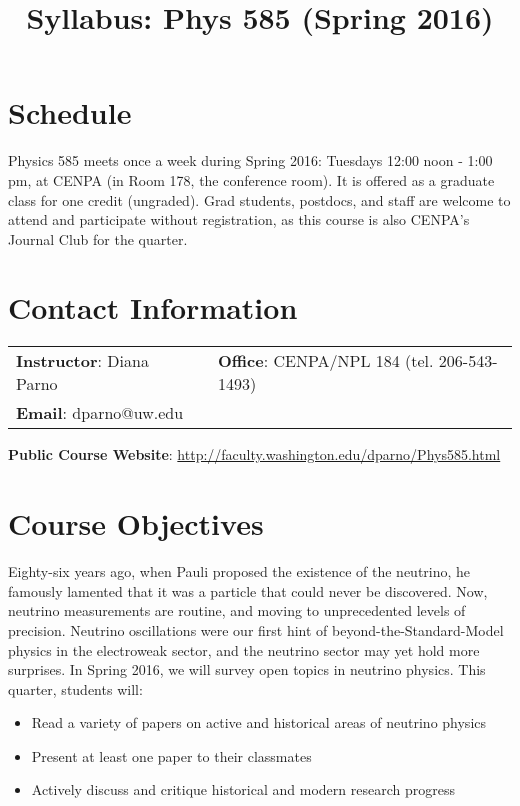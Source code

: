 \documentclass[12pt]{amsart}
\title{Syllabus: Phys 585 (Spring 2016)}
\date{} %
\begin{document}
\maketitle

\section{Schedule}

Physics 585 meets once a week during Spring 2016: Tuesdays 12:00 noon - 1:00 pm, at CENPA (in Room 178, the conference room). It is offered as a graduate class for one credit (ungraded). Grad students, postdocs, and staff are welcome to attend and participate without registration, as this course is also CENPA's Journal Club for the quarter.

\section{Contact Information}
\begin{tabular}{lcl}
\textbf{Instructor}: Diana Parno &             & \textbf{Office}: CENPA/NPL 184 (tel. 206-543-1493) \\
\textbf{Email}: dparno@uw.edu &             &  \\
\hline
\end{tabular}\newline

\textbf{Public Course Website}: \url{http://faculty.washington.edu/dparno/Phys585.html}

\section{Course Objectives}

Eighty-six years ago, when Pauli proposed the existence of the neutrino, he famously lamented that it was a particle that could never be discovered. Now, neutrino measurements are routine, and moving to unprecedented levels of precision. Neutrino oscillations were our first hint of beyond-the-Standard-Model physics in the electroweak sector, and the neutrino sector may yet hold more surprises. In Spring 2016, we will survey open topics in neutrino physics. This quarter, students will:

\begin{itemize}
	\item	Read a variety of papers on active and historical areas of neutrino physics
	\item	Present at least one paper to their classmates
	\item	Actively discuss and critique historical and modern research progress
\end{itemize}
\end{document}
